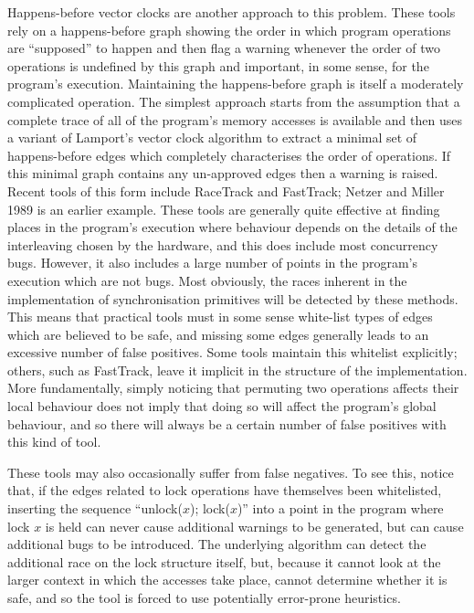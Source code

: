 Happens-before vector clocks are another approach to this problem.
These tools rely on a happens-before graph showing the order in which
program operations are ``supposed'' to happen and then flag a warning
whenever the order of two operations is undefined by this graph and
important, in some sense, for the program's execution.  Maintaining
the happens-before graph is itself a moderately complicated operation.
The simplest approach starts from the assumption that a complete trace
of all of the program's memory accesses is available and then uses a
variant of Lamport's vector clock algorithm\cite{Lamport1978} to
extract a minimal set of happens-before edges which completely
characterises the order of operations.  If this minimal graph contains
any un-approved edges then a warning is raised.  Recent tools
of this form include RaceTrack\cite{Yu2005} and
FastTrack\cite{Flanagan2009}; Netzer and Miller 1989\needCite{} is an
earlier example.  These tools are generally quite effective at finding
places in the program's execution where behaviour depends on the
details of the interleaving chosen by the hardware, and this does
include most concurrency bugs.  However, it also includes a large
number of points in the program's execution which are not bugs.  Most
obviously, the races inherent in the implementation of synchronisation
primitives will be detected by these methods.  This means that
practical tools must in some sense white-list types of edges which are
believed to be safe, and missing some edges generally leads to an
excessive number of false positives.  Some tools maintain this
whitelist explicitly\needCite{}; others, such as FastTrack, leave it
implicit in the structure of the implementation.  More fundamentally,
simply noticing that permuting two operations affects their local
behaviour does not imply that doing so will affect the program's
global behaviour, and so there will always be a certain number of
false positives with this kind of tool.

These tools may also occasionally suffer from false negatives.  To see
this, notice that, if the edges related to lock operations have
themselves been whitelisted, inserting the sequence ``unlock($x$);
lock($x$)'' into a point in the program where lock $x$ is held can
never cause additional warnings to be generated, but can cause
additional bugs to be introduced.  The underlying algorithm can detect
the additional race on the lock structure itself, but, because it
cannot look at the larger context in which the accesses take place,
cannot determine whether it is safe, and so the tool is forced to use
potentially error-prone heuristics.

